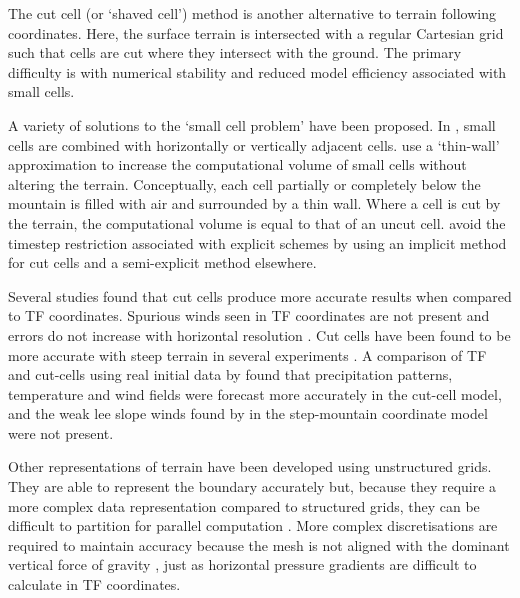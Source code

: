 
The cut cell (or `shaved cell')  method is another alternative to terrain following coordinates.  Here, the surface terrain is intersected with a regular Cartesian grid such that cells are cut where they intersect with the ground.   The primary difficulty is with numerical stability and reduced model efficiency associated with small cells. 

A variety of solutions to the `small cell problem' have been proposed.  In \textcite{yamazaki-satomura2010}, small cells are combined with horizontally or vertically adjacent cells.     \textcite{steppeler2002} use a `thin-wall' approximation to increase the computational volume of small cells without altering the terrain.  Conceptually, each cell partially or completely below the mountain is filled with air and surrounded by a thin wall.  Where a cell is cut by the terrain, the computational volume is equal to that of an uncut cell.  \textcite{jebens2011} avoid the timestep restriction associated with explicit schemes by using an implicit method for cut cells and a semi-explicit method elsewhere.

Several studies found that cut cells produce more accurate results when compared to TF coordinates.  Spurious winds seen in TF coordinates are not present and errors do not increase with horizontal resolution \autocite{good2013}.  Cut cells have been found to be more accurate with steep terrain in several experiments \parencites{good2013}{yamazaki-satomura2010}.  A comparison of TF and cut-cells using real initial data by \textcite{steppeler2006} found that precipitation patterns, temperature and wind fields were forecast more accurately in the cut-cell model, and the weak lee slope winds found by \textcite{gallus-klemp2000} in the step-mountain coordinate model were not present.  

Other representations of terrain have been developed using unstructured grids.  They are able to represent the boundary accurately but, because they require a more complex data representation compared to structured grids, they can be difficult to partition for parallel computation \autocite{steppeler2003}.  More complex discretisations are required to maintain accuracy because the mesh is not aligned with the dominant vertical force of gravity \autocite{rosatti2005}, just as horizontal pressure gradients are difficult to calculate in TF coordinates.  


